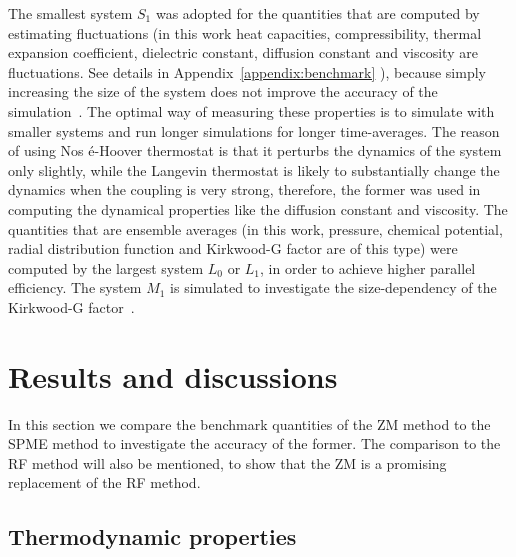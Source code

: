 \documentclass[a4paper,preprint,unsortedaddress,onecolumn,fleqn]{revtex4}
\begin{document}

The smallest system $S_{1}$ was adopted for the quantities that are computed
by estimating fluctuations (in this work heat capacities, compressibility,
thermal expansion coefficient, dielectric constant, diffusion constant and
viscosity are fluctuations. See details in Appendix~\ref{appendix:benchmark}%
), because simply increasing the size of the system does not
improve the accuracy of the simulation~\cite%
{milchev1986fluctuations,ferrenberg1991statistical}. The optimal way of
measuring these properties is to simulate with smaller systems 
and run longer simulations for longer time-averages. The reason of using Nos%
\'{e}-Hoover thermostat is that it perturbs the dynamics of the system only
slightly, while the Langevin thermostat is likely to substantially change
the dynamics when the coupling is very strong, therefore, the former was
used in computing the dynamical properties like the diffusion constant and
viscosity. The quantities that are ensemble averages (in this work,
pressure, chemical potential, radial distribution function and Kirkwood-G
factor are of this type) were computed by the largest system $L_{0}$ or $L_{1}$, in order to
achieve higher parallel efficiency. The system $M_{1}$ is simulated to
investigate the size-dependency of the Kirkwood-G factor~\cite%
{vanderSpoel2006origin}.

\section{Results and discussions}

In this section we compare the benchmark quantities of the ZM method to the
SPME method to investigate the accuracy of the former. The comparison to the
RF method will also be mentioned, to show that the ZM is a promising
replacement of the RF method.

\subsection{Thermodynamic properties}
\end{document}
